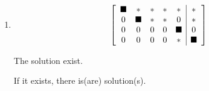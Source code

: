 \documentclass{ximera}
\begin{document}
\begin{problem}
\begin{enumerate}
\item \begin{equation*}
    \startmat{ccccc|c}
      \blacksquare & \ast & \ast & \ast & \ast & \ast \\
      0 & \blacksquare & \ast & \ast & 0 & \ast \\
      0 & 0 & 0 & 0 & \blacksquare & 0 \\
      0 & 0 & 0 & 0 & \ast & \blacksquare
    \stopmat
\end{equation*}

The solution  exist.

    \begin{problem}
    
        If it exists, there is(are)  solution(s).

    \end{problem}


\end{enumerate}

\end{problem}
\end{document}
